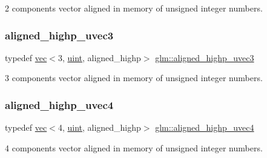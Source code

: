2 components vector aligned in memory of unsigned integer numbers. 

\mbox{\label{group__gtc__type__aligned_ga1d303644825af6267389d6405f490ddc}} 
\subsubsection{\texorpdfstring{aligned\+\_\+highp\+\_\+uvec3}{aligned\_highp\_uvec3}}
{\footnotesize\ttfamily typedef \mbox{\hyperlink{structglm_1_1vec}{vec}}$<$3, \mbox{\hyperlink{group__core__precision_ga4fd29415871152bfb5abd588334147c8}{uint}}, aligned\+\_\+highp$>$ \mbox{\hyperlink{group__gtc__type__aligned_ga1d303644825af6267389d6405f490ddc}{glm\+::aligned\+\_\+highp\+\_\+uvec3}}}



3 components vector aligned in memory of unsigned integer numbers. 

\mbox{\label{group__gtc__type__aligned_ga85553b476297f73c07bf3228ffb02d81}} 
\subsubsection{\texorpdfstring{aligned\+\_\+highp\+\_\+uvec4}{aligned\_highp\_uvec4}}
{\footnotesize\ttfamily typedef \mbox{\hyperlink{structglm_1_1vec}{vec}}$<$4, \mbox{\hyperlink{group__core__precision_ga4fd29415871152bfb5abd588334147c8}{uint}}, aligned\+\_\+highp$>$ \mbox{\hyperlink{group__gtc__type__aligned_ga85553b476297f73c07bf3228ffb02d81}{glm\+::aligned\+\_\+highp\+\_\+uvec4}}}



4 components vector aligned in memory of unsigned integer numbers. 

\mbox{\label{group__gtc__type__aligned_ga8da7535c1fe488b2b9a29c0c05e7b17e}} 
